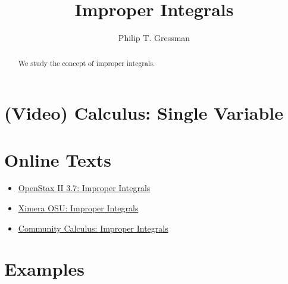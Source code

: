 \documentclass{ximera}
\title{Improper Integrals}
\author{Philip T. Gressman}
\begin{document}
\begin{abstract}
We study the concept of improper integrals.
\end{abstract}
\maketitle

\section*{(Video) Calculus: Single Variable}

\section*{Online Texts}
\begin{itemize}
\item \href{https://openstax.org/books/calculus-volume-2/pages/3-7-improper-integrals}{OpenStax II 3.7: Improper Integrals}
\item \href{https://ximera.osu.edu/mooculus/calculus2/improperIntegrals/titlePage}{Ximera OSU: Improper Integrals}
\item \href{https://www.whitman.edu/mathematics/calculus_online/section09.07.html}{Community Calculus: Improper Integrals}
\end{itemize}

\section*{Examples}

\begin{example}

\end{example}

\begin{example}

\end{example}
\end{document}
